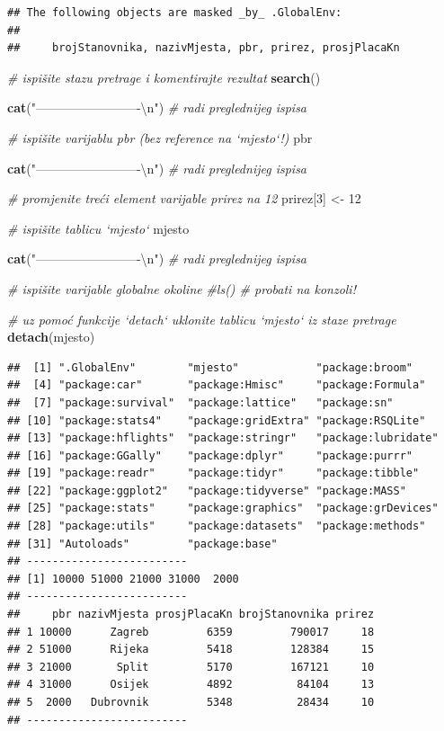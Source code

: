 \documentclass[]{book}
\newenvironment{Shaded}{\begin{snugshade}}{\end{snugshade}}
\newcommand{\KeywordTok}[1]{\textcolor[rgb]{0.13,0.29,0.53}{\textbf{#1}}}
\newcommand{\DecValTok}[1]{\textcolor[rgb]{0.00,0.00,0.81}{#1}}
\newcommand{\CharTok}[1]{\textcolor[rgb]{0.31,0.60,0.02}{#1}}
\newcommand{\StringTok}[1]{\textcolor[rgb]{0.31,0.60,0.02}{#1}}
\newcommand{\CommentTok}[1]{\textcolor[rgb]{0.56,0.35,0.01}{\textit{#1}}}
\newcommand{\NormalTok}[1]{#1}
\theoremstyle{definition}
\theoremstyle{definition}
\theoremstyle{definition}
\theoremstyle{remark}
\begin{document}
\begin{verbatim}
## The following objects are masked _by_ .GlobalEnv:
## 
##     brojStanovnika, nazivMjesta, pbr, prirez, prosjPlacaKn
\end{verbatim}

\begin{Shaded}
\begin{Highlighting}[]
\CommentTok{# ispišite stazu pretrage i komentirajte rezultat}
\KeywordTok{search}\NormalTok{()}

\KeywordTok{cat}\NormalTok{(}\StringTok{"-------------------------}\CharTok{\textbackslash{}n}\StringTok{"}\NormalTok{)    }\CommentTok{# radi preglednijeg ispisa}

\CommentTok{# ispišite varijablu pbr (bez reference na `mjesto`!)}
\NormalTok{pbr}

\KeywordTok{cat}\NormalTok{(}\StringTok{"-------------------------}\CharTok{\textbackslash{}n}\StringTok{"}\NormalTok{)    }\CommentTok{# radi preglednijeg ispisa}

\CommentTok{# promjenite treći element varijable prirez na 12}
\NormalTok{prirez[}\DecValTok{3}\NormalTok{] <-}\StringTok{ }\DecValTok{12}

\CommentTok{# ispišite tablicu `mjesto`}
\NormalTok{mjesto}

\KeywordTok{cat}\NormalTok{(}\StringTok{"-------------------------}\CharTok{\textbackslash{}n}\StringTok{"}\NormalTok{)    }\CommentTok{# radi preglednijeg ispisa}

\CommentTok{# ispišite varijable globalne okoline}
\CommentTok{#ls()  # probati na konzoli!}

\CommentTok{# uz pomoć funkcije `detach` uklonite tablicu `mjesto` iz staze pretrage}
\KeywordTok{detach}\NormalTok{(mjesto)}
\end{Highlighting}
\end{Shaded}

\begin{verbatim}
##  [1] ".GlobalEnv"        "mjesto"            "package:broom"    
##  [4] "package:car"       "package:Hmisc"     "package:Formula"  
##  [7] "package:survival"  "package:lattice"   "package:sn"       
## [10] "package:stats4"    "package:gridExtra" "package:RSQLite"  
## [13] "package:hflights"  "package:stringr"   "package:lubridate"
## [16] "package:GGally"    "package:dplyr"     "package:purrr"    
## [19] "package:readr"     "package:tidyr"     "package:tibble"   
## [22] "package:ggplot2"   "package:tidyverse" "package:MASS"     
## [25] "package:stats"     "package:graphics"  "package:grDevices"
## [28] "package:utils"     "package:datasets"  "package:methods"  
## [31] "Autoloads"         "package:base"     
## -------------------------
## [1] 10000 51000 21000 31000  2000
## -------------------------
##     pbr nazivMjesta prosjPlacaKn brojStanovnika prirez
## 1 10000      Zagreb         6359         790017     18
## 2 51000      Rijeka         5418         128384     15
## 3 21000       Split         5170         167121     10
## 4 31000      Osijek         4892          84104     13
## 5  2000   Dubrovnik         5348          28434     10
## -------------------------
\end{verbatim}
\end{document}
